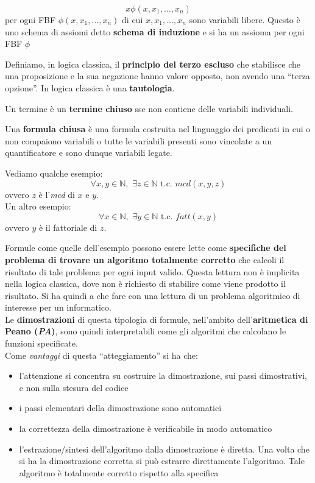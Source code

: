 \documentclass[a4paper,12pt, oneside]{book}
\begin{document}
\begin{shaded}
\begin{definizione}
{{\[      x\phi(x,x_1,\ldots,x_n)\]}}
    per ogni FBF $\phi(x,x_1,\ldots,x_n)$ di cui
    $x,x_1,\ldots,x_n$ sono variabili libere. Questo è uno schema di assiomi
    detto \textbf{schema di induzione} e si ha un assioma per ogni FBF
    $\phi$ 
  \end{definizione}
  \begin{definizione}
    Definiamo, in logica classica, il \textbf{principio del terzo escluso} che
    stabilisce che una proposizione e la sua negazione hanno valore opposto, non
    avendo una ``terza opzione''. In logica classica è una \textbf{tautologia}.
  \end{definizione}
  \begin{definizione}
    Un termine è un \textbf{termine chiuso} sse non contiene delle variabili
    individuali.  
  \end{definizione}
  \begin{definizione}
    Una \textbf{formula chiusa} è una formula costruita nel linguaggio dei
    predicati in cui o non compaiono variabili o tutte le variabili presenti
    sono vincolate a un quantificatore e sono dunque variabili legate. 
  \end{definizione}
\end{shaded}
\begin{esempio}
  Vediamo qualche esempio:
  \[\forall x,y\in\mathbb{N},\,\,\exists z\in\mathbb{N}\mbox{ t.c. }
    mcd(x,y,z)\]
  ovvero $z$ è l'\textit{mcd} di $x$ e $y$.\\
  Un altro esempio:
  \[\forall x\in \mathbb{N},\,\,\exists y\in \mathbb{N}\mbox{ t.c. }
    fatt(x,y)\]
  ovvero $y$ è il fattoriale di $z$.
\end{esempio}
Formule come quelle dell'esempio possono essere lette come \textbf{specifiche
  del problema di trovare un algoritmo totalmente corretto} che calcoli il
risultato di tale problema per ogni input valido. Questa lettura non è implicita
nella logica classica, dove non è richiesto di stabilire come viene prodotto il
risultato. Si ha quindi a che fare con una lettura di un problema algoritmico di
interesse per un informatico.\\
Le \textbf{dimostrazioni} di questa tipologia di formule, nell'ambito
dell'\textbf{aritmetica di Peano (\textit{PA})}, sono quindi interpretabili come
gli algoritmi che calcolano le funzioni specificate. \\
Come \textit{vantaggi} di questa ``atteggiamento'' si ha che:
\begin{itemize}
  \item l'attenzione si concentra su costruire la dimostrazione, sui passi
  dimostrativi, e non sulla stesura del codice
  \item i passi elementari della dimostrazione sono automatici
  \item la correttezza della dimostrazione è verificabile in modo automatico
  \item l'estrazione/sintesi dell'algoritmo dalla dimostrazione è diretta. Una
  volta che si ha la dimostrazione corretta si può estrarre direttamente
  l'algoritmo. Tale algoritmo è totalmente corretto rispetto alla specifica
\end{itemize}
\end{document}

